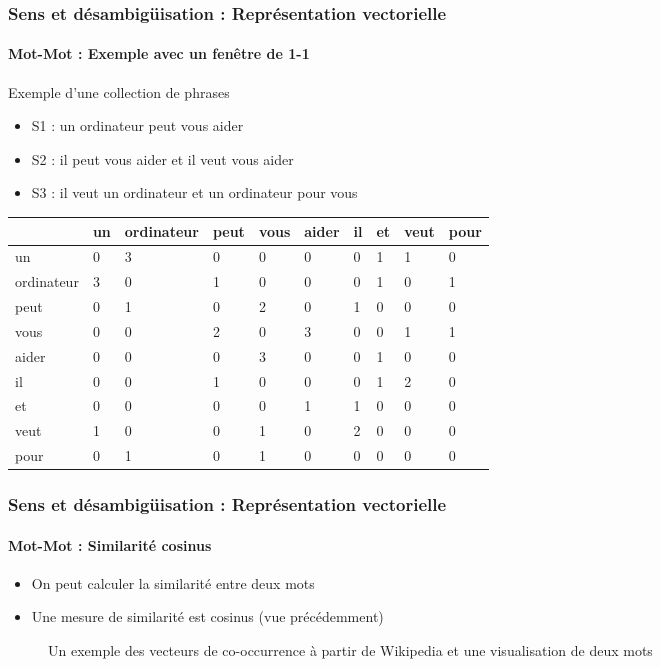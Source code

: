 \documentclass[xcolor=table]{beamer}
\begin{document}
\begin{frame}
\frametitle{Sens et désambigüisation : Représentation vectorielle}
\framesubtitle{Mot-Mot : Exemple avec un fenêtre de 1-1}

\begin{exampleblock}{Exemple d'une collection de phrases}
	\begin{itemize}
		\item S1 : un ordinateur peut vous aider
		\item S2 : il peut vous aider et il veut vous aider
		\item S3 : il veut un ordinateur et un ordinateur pour vous
	\end{itemize}
\end{exampleblock}

\begin{center}
	\scriptsize
	\begin{tabular}{llllllllll}
		\hline\hline
		& un & ordinateur & peut & vous & aider & il & et & veut & pour \\
		\hline
		un & 0 & 3 & 0 & 0 & 0 & 0 & 1 & 1 & 0\\
		ordinateur & 3 & 0 & 1 & 0 & 0 & 0 & 1 & 0 & 1\\
		peut & 0 & 1 & 0 & 2 & 0 & 1 & 0 & 0 & 0\\
		vous & 0 & 0 & 2 & 0 & 3 & 0 & 0 & 1 & 1\\
		aider & 0 & 0 & 0 & 3 & 0 & 0 & 1 & 0 & 0\\
		il & 0 & 0 & 1 & 0 & 0 & 0 & 1 & 2 & 0\\
		et & 0 & 0 & 0 & 0 & 1 & 1 & 0 & 0 & 0\\
		veut & 1 & 0 & 0 & 1 & 0 & 2 & 0 & 0 & 0\\
		pour & 0 & 1 & 0 & 1 & 0 & 0 & 0 & 0 & 0\\
		\hline\hline
	\end{tabular}
\end{center}

\end{frame}

\begin{frame}
\frametitle{Sens et désambigüisation : Représentation vectorielle}
\framesubtitle{Mot-Mot : Similarité cosinus}

\begin{itemize}
	\item On peut calculer la similarité entre deux mots
	\item Une mesure de similarité est cosinus (vue précédemment)
\end{itemize}


\begin{minipage}{.58\textwidth}
	\begin{figure}
		\caption{Un exemple des vecteurs de co-occurrence à partir de Wikipedia et une visualisation de deux mots \cite{2019-jurafsky-martin} }
	\end{figure}
\end{minipage}
\begin{minipage}{.4\textwidth}
\end{minipage}

\end{frame}
\end{document}
